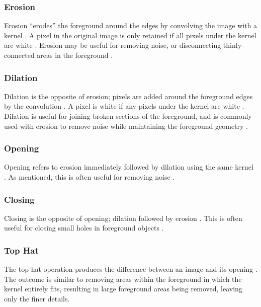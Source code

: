 \subsubsection*{Erosion}

Erosion ``erodes'' the foreground around the edges by convolving the image with a kernel \cite{opencv_mt}. A pixel in the original image is only retained if all pixels under the kernel are white \cite{opencv_mt}. Erosion may be useful for removing noise, or disconnecting thinly-connected areas in the foreground \cite{opencv_mt}.

\subsubsection*{Dilation}

Dilation is the opposite of erosion; pixels are added around the foreground edges by the convolution \cite{opencv_mt}. A pixel is white if any pixels under the kernel are white \cite{opencv_mt}. Dilation is useful for joining broken sections of the foreground, and is commonly used with erosion to remove noise while maintaining the foreground geometry \cite{opencv_mt}.

\subsubsection*{Opening}

Opening refers to erosion immediately followed by dilation using the same kernel \cite{opencv_mt}. As mentioned, this is often useful for removing noise \cite{opencv_mt}.

\subsubsection*{Closing}

Closing is the opposite of opening; dilation followed by erosion \cite{opencv_mt}. This is often useful for closing small holes in foreground objects \cite{opencv_mt}.

\subsubsection*{Top Hat}

The top hat operation produces the difference between an image and its opening \cite{opencv_mt}. The outcome is similar to removing areas within the foreground in which the kernel entirely fits, resulting in large foreground areas being removed, leaving only the finer details.

